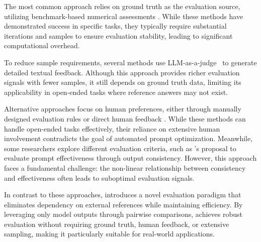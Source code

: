 The most common approach relies on ground truth as the evaluation source, utilizing benchmark-based numerical assessments \cite{yong2023ape, qing2024evoprompt, yang2023opro, chris2024pb, xin2024pa, omar2024dspy}. While these methods have demonstrated success in specific tasks, they typically require substantial iterations and samples to ensure evaluation stability, leading to significant computational overhead.

To reduce sample requirements, several methods \cite{cilin2024erm, mert2024textgrad, yu2024stargo, wang2024semantic, reid2023protegi, ya2025ttpo} use LLM-as-a-judge~\cite{lianmin2023mtbench} to generate detailed textual feedback. Although this approach provides richer evaluation signals with fewer samples, it still depends on ground truth data, limiting its applicability in open-ended tasks where reference answers may not exist.

Alternative approaches focus on human preferences, either through manually designed evaluation rules or direct human feedback \cite{yong2024promst, lin2024apohf}. While these methods can handle open-ended tasks effectively, their reliance on extensive human involvement contradicts the goal of automated prompt optimization. Meanwhile, some researchers explore different evaluation criteria, such as \citet{xuan2024glape}'s proposal to evaluate prompt effectiveness through output consistency. However, this approach faces a fundamental challenge: the non-linear relationship between consistency and effectiveness often leads to suboptimal evaluation signals.

In contrast to these approaches, \ours introduces a novel evaluation paradigm that eliminates dependency on external references while maintaining efficiency. By leveraging only model outputs through pairwise comparisons, \ours achieves robust evaluation without requiring ground truth, human feedback, or extensive sampling, making it particularly suitable for real-world applications.